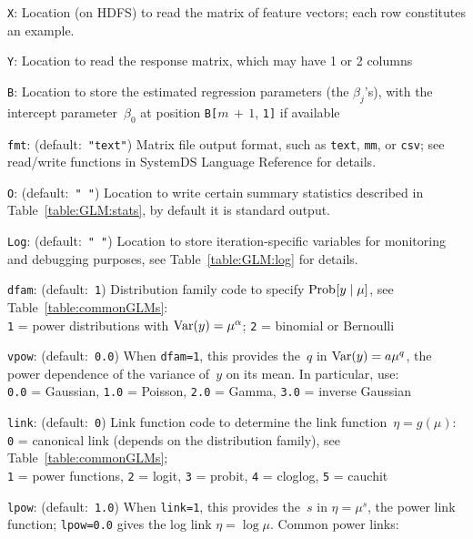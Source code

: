 \smallskip
{}
\begin{Description}
\item[{\tt X}:]
Location (on HDFS) to read the matrix of feature vectors; each row constitutes
an example.
\item[{\tt Y}:]
Location to read the response matrix, which may have 1 or 2 columns
\item[{\tt B}:]
Location to store the estimated regression parameters (the $\beta_j$'s), with the
intercept parameter~$\beta_0$ at position {\tt B[}$m\,{+}\,1$, {\tt 1]} if available
\item[{\tt fmt}:] (default:\mbox{ }{\tt "text"})
Matrix file output format, such as {\tt text}, {\tt mm}, or {\tt csv};
see read/write functions in SystemDS Language Reference for details.
\item[{\tt O}:] (default:\mbox{ }{\tt " "})
Location to write certain summary statistics described in Table~\ref{table:GLM:stats},
by default it is standard output.
\item[{\tt Log}:] (default:\mbox{ }{\tt " "})
Location to store iteration-specific variables for monitoring and debugging purposes,
see Table~\ref{table:GLM:log} for details.
\item[{\tt dfam}:] (default:\mbox{ }{\tt 1})
Distribution family code to specify $\mathop{\mathrm{Prob}\hspace{0.5pt}}\nolimits[y\mid \mu]$, see Table~\ref{table:commonGLMs}:\\
{\tt 1} = power distributions with $\mathop{\mathrm{Var}}\nolimits(y) = \mu^{\alpha}$;
{\tt 2} = binomial or Bernoulli
\item[{\tt vpow}:] (default:\mbox{ }{\tt 0.0})
When {\tt dfam=1}, this provides the~$q$ in $\mathop{\mathrm{Var}}\nolimits(y) = a\mu^q$, the power
dependence of the variance of~$y$ on its mean.  In particular, use:\\
{\tt 0.0} = Gaussian,
{\tt 1.0} = Poisson,
{\tt 2.0} = Gamma,
{\tt 3.0} = inverse Gaussian
\item[{\tt link}:] (default:\mbox{ }{\tt 0})
Link function code to determine the link function~$\eta = g(\mu)$:\\
{\tt 0} = canonical link (depends on the distribution family), see Table~\ref{table:commonGLMs};\\
{\tt 1} = power functions,
{\tt 2} = logit,
{\tt 3} = probit,
{\tt 4} = cloglog,
{\tt 5} = cauchit
\item[{\tt lpow}:] (default:\mbox{ }{\tt 1.0})
When {\tt link=1}, this provides the~$s$ in $\eta = \mu^s$, the power link
function; {\tt lpow=0.0} gives the log link $\eta = \log\mu$.  Common power links:\\

\end{Description}
